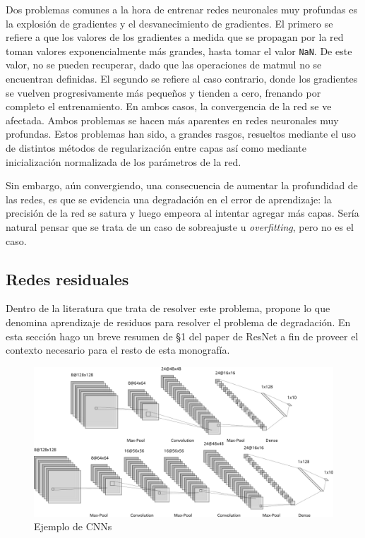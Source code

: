 \documentclass[titlepage,a4paper,oneside]{article}
\begin{document}
Dos problemas comunes a la hora de entrenar redes neuronales muy profundas es la explosión de gradientes y el desvanecimiento de gradientes. El primero se refiere a que los valores de los gradientes a medida que se propagan por la red toman valores exponencialmente más grandes, hasta tomar el valor \texttt{NaN}. De este valor, no se pueden recuperar, dado que las operaciones de matmul no se encuentran definidas. El segundo se refiere al caso contrario, donde los gradientes se vuelven progresivamente más pequeños y tienden a cero, frenando por completo el entrenamiento. En ambos casos, la convergencia de la red se ve afectada. Ambos problemas se hacen más aparentes en redes neuronales muy profundas. Estos problemas han sido, a grandes rasgos, resueltos mediante el uso de distintos métodos de regularización entre capas así como mediante inicialización normalizada de los parámetros de la red.

Sin embargo, aún convergiendo, una consecuencia de aumentar la profundidad de las redes, es que se evidencia una degradación en el error de aprendizaje: la precisión de la red se satura y luego empeora al intentar agregar más capas. Sería natural pensar que se trata de un caso de sobreajuste u \textit{overfitting}, pero no es el caso.


\subsection{Redes residuales}
Dentro de la literatura que trata de resolver este problema, \cite{DBLP:journals/corr/HeZRS15} propone lo que denomina aprendizaje de residuos para resolver el problema de degradación. En esta sección hago un breve resumen de \S 1 del paper de ResNet a fin de proveer el contexto necesario para el resto de esta monografía.

\begin{figure}[H]
\centering
\includegraphics[width=\textwidth]{images/ex_cnns.png}
\caption{Ejemplo de CNNs}
\label{ex_cnn}
\end{figure}
\end{document}
